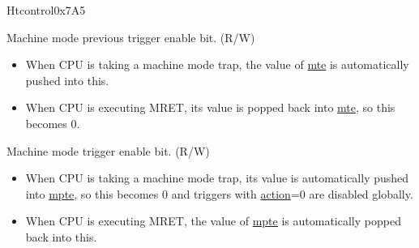 \begin{register}{H}{tcontrol}{0x7A5}\label{regdesc:TCONTROL}
%
%
%
%
%
\regnewline%
\begin{regdesc}\begin{reglist}
\label{fielddesc:TCONTROLMPTE}\item [mpte] Machine mode previous trigger enable bit. (R/W)
\begin{itemize}
    \setlength\itemsep{-1em}
    \item When CPU is taking a machine mode trap, the value of \hyperref[fielddesc:TCONTROLMTE]{mte} is automatically pushed into this.
    \item When CPU is executing MRET, its value is popped back into \hyperref[fielddesc:TCONTROLMTE]{mte}, so this becomes 0.
\end{itemize}
\label{fielddesc:TCONTROLMTE}\item [mte] Machine mode trigger enable bit. (R/W)
\begin{itemize}
    \setlength\itemsep{-1em}
    \item When CPU is taking a machine mode trap, its value is automatically pushed into \hyperref[fielddesc:TCONTROLMPTE]{mpte}, so this becomes 0 and triggers with \hyperref[fielddesc:MCONTROLACTION]{action}=0 are disabled globally.
    \item When CPU is executing MRET, the value of \hyperref[fielddesc:TCONTROLMPTE]{mpte} is automatically popped back into this.
\end{itemize}
\end{reglist}\end{regdesc}
\end{register}

